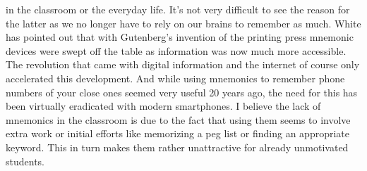 in the classroom or the everyday life. It's not very difficult to see the reason for the latter as we no longer have to rely on our brains to remember as much. White has pointed out that with Gutenberg's invention of the printing press mnemonic devices were swept off the table as information was now much more accessible. \cite{white_2014} The revolution that came with digital information and the internet of course only accelerated this development. And while using mnemonics to remember phone numbers of your close ones seemed very useful 20 years ago, the need for this has been virtually eradicated with modern smartphones.
I believe the lack of mnemonics in the classroom is due to the fact that using them seems to involve extra work or initial efforts like memorizing a peg list or finding an appropriate keyword. This in turn makes them rather unattractive for already unmotivated students.    

